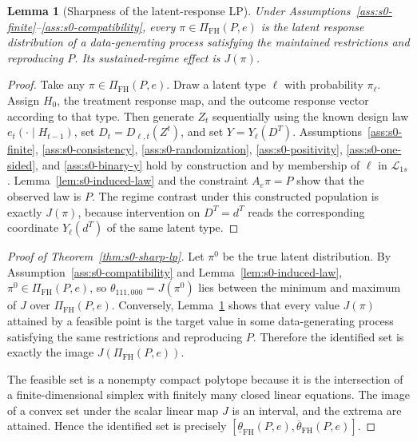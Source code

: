 \documentclass[11pt]{article}
\theoremstyle{definition}
\theoremstyle{plain}
\newtheorem{lemma}{Lemma}
\theoremstyle{remark}
\begin{document}
\begin{lemma}[Sharpness of the latent-response LP]\label{lem:s0-sharpness}
Under Assumptions~\ref{ass:s0-finite}--\ref{ass:s0-compatibility}, every \(\pi\in\Pi_{\mathrm{FH}}(P,e)\) is the latent response distribution of a data-generating process satisfying the maintained restrictions and reproducing \(P\).  Its sustained-regime effect is \(J(\pi)\).
\end{lemma}

\begin{proof}
Take any \(\pi\in\Pi_{\mathrm{FH}}(P,e)\).  Draw a latent type \(\ell\) with probability \(\pi_\ell\).  Assign \(H_0\), the treatment response map, and the outcome response vector according to that type.  Then generate \(Z_t\) sequentially using the known design law \(e_t(\cdot\mid H_{t-1})\), set \(D_t=D_{\ell,t}(Z^t)\), and set \(Y=Y_\ell(D^T)\).  Assumptions~\ref{ass:s0-finite}, \ref{ass:s0-consistency}, \ref{ass:s0-randomization}, \ref{ass:s0-positivity}, \ref{ass:s0-one-sided}, and \ref{ass:s0-binary-y} hold by construction and by membership of \(\ell\) in \(\mathcal L_{1s}\).  Lemma~\ref{lem:s0-induced-law} and the constraint \(A_e\pi=P\) show that the observed law is \(P\).  The regime contrast under this constructed population is exactly \(J(\pi)\), because intervention on \(D^T=d^T\) reads the corresponding coordinate \(Y_\ell(d^T)\) of the same latent type.
\end{proof}

\begin{proof}[Proof of Theorem~\ref{thm:s0-sharp-lp}]
Let \(\pi^0\) be the true latent distribution.  By Assumption~\ref{ass:s0-compatibility} and Lemma~\ref{lem:s0-induced-law}, \(\pi^0\in\Pi_{\mathrm{FH}}(P,e)\), so \(\theta_{111,000}=J(\pi^0)\) lies between the minimum and maximum of \(J\) over \(\Pi_{\mathrm{FH}}(P,e)\).  Conversely, Lemma~\ref{lem:s0-sharpness} shows that every value \(J(\pi)\) attained by a feasible point is the target value in some data-generating process satisfying the same restrictions and reproducing \(P\).  Therefore the identified set is exactly the image \(J(\Pi_{\mathrm{FH}}(P,e))\).

The feasible set is a nonempty compact polytope because it is the intersection of a finite-dimensional simplex with finitely many closed linear equations.  The image of a convex set under the scalar linear map \(J\) is an interval, and the extrema are attained.  Hence the identified set is precisely \([\underline\theta_{\mathrm{FH}}(P,e),\overline\theta_{\mathrm{FH}}(P,e)]\).
\end{proof}
\end{document}
